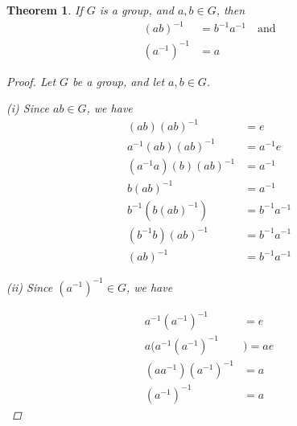 \documentclass{article}
\newtheorem{theorem}{Theorem}
\begin{document}
\begin{theorem}
If $G$ is a group, and $a,b \in G$, then
\begin{align*}
\tag{i} (ab)^{-1}&=b^{-1}a^{-1} \quad \text{and}\\
\tag{ii} (a^{-1})^{-1}&=a
\end{align*}

\begin{proof}
Let $G$ be a group, and let $a,b \in G$.

(i) Since $ab \in G$, we have
\begin{align*}
(ab)(ab)^{-1}&=e\\
a^{-1}(ab)(ab)^{-1}&=a^{-1}e\\
(a^{-1}a)(b)(ab)^{-1}&=a^{-1}\\
b(ab)^{-1}&=a^{-1}\\
b^{-1}(b(ab)^{-1})&=b^{-1}a^{-1}\\
(b^{-1}b)(ab)^{-1}&=b^{-1}a^{-1}\\
(ab)^{-1}&=b^{-1}a^{-1}
\end{align*}

(ii) Since $(a^{-1})^{-1} \in G$, we have

\begin{align*}
a^{-1}(a^{-1})^{-1}&=e\\
a(a^{-1}(a^{-1})^{-1}&)=ae\\
(aa^{-1})(a^{-1})^{-1}&=a\\
(a^{-1})^{-1}&=a
\end{align*}
\end{proof}
\end{theorem}
\end{document}
